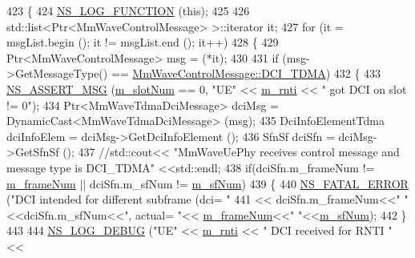 \begin{DoxyCode}
423 \{
424         \hyperlink{log-macros-disabled_8h_a90b90d5bad1f39cb1b64923ea94c0761}{NS\_LOG\_FUNCTION} (\textcolor{keyword}{this});
425 
426         std::list<Ptr<MmWaveControlMessage> >::iterator it;
427         \textcolor{keywordflow}{for} (it = msgList.begin (); it != msgList.end (); it++)
428         \{
429                 Ptr<MmWaveControlMessage> msg = (*it);
430 
431                 \textcolor{keywordflow}{if} (msg->GetMessageType() == \hyperlink{classns3_1_1MmWaveControlMessage_afd7af53dea4ef8b652cf206acd508869a3def507a310c2ded862e95b929cfd34b}{MmWaveControlMessage::DCI\_TDMA})
432                 \{
433                         \hyperlink{assert_8h_aff5ece9066c74e681e74999856f08539}{NS\_ASSERT\_MSG} (\hyperlink{classns3_1_1MmWavePhy_a6c83cdb8c36a9a58ae8b9f17933680ac}{m\_slotNum} == 0, \textcolor{stringliteral}{"UE"} << 
      \hyperlink{classns3_1_1MmWaveUePhy_aae63c66b69de47ac19b4033ecf4bc211}{m\_rnti} << \textcolor{stringliteral}{" got DCI on slot != 0"});
434                         Ptr<MmWaveTdmaDciMessage> dciMsg = DynamicCast<MmWaveTdmaDciMessage> (msg);
435                         DciInfoElementTdma dciInfoElem = dciMsg->GetDciInfoElement ();
436                         SfnSf dciSfn = dciMsg->GetSfnSf ();
437                                 \textcolor{comment}{//std::cout<< "MmWaveUePhy receives control message and message type is
       DCI\_TDMA" <<std::endl;}
438                         \textcolor{keywordflow}{if}(dciSfn.m\_frameNum != \hyperlink{classns3_1_1MmWavePhy_a852ce585035a1c12122d2775e64ff38a}{m\_frameNum} || dciSfn.m\_sfNum != 
      \hyperlink{classns3_1_1MmWavePhy_af3d76eb9f3e5e1ff669852d05986c1a3}{m\_sfNum})
439                         \{
440                                 \hyperlink{group__fatal_ga5131d5e3f75d7d4cbfd706ac456fdc85}{NS\_FATAL\_ERROR} (\textcolor{stringliteral}{"DCI intended for different subframe (dci= "}
441                                                 << dciSfn.m\_frameNum<<\textcolor{stringliteral}{" "}<<dciSfn.m\_sfNum<<\textcolor{stringliteral}{", actual= "}<<
      \hyperlink{classns3_1_1MmWavePhy_a852ce585035a1c12122d2775e64ff38a}{m\_frameNum}<<\textcolor{stringliteral}{" "}<<\hyperlink{classns3_1_1MmWavePhy_af3d76eb9f3e5e1ff669852d05986c1a3}{m\_sfNum});
442                         \}
443 
444                         \hyperlink{group__logging_ga413f1886406d49f59a6a0a89b77b4d0a}{NS\_LOG\_DEBUG} (\textcolor{stringliteral}{"UE"} << \hyperlink{classns3_1_1MmWaveUePhy_aae63c66b69de47ac19b4033ecf4bc211}{m\_rnti} << \textcolor{stringliteral}{" DCI received for RNTI "} << 

\end{DoxyCode}
